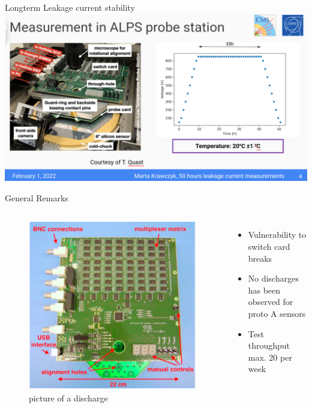 \documentclass{beamer}
\begin{document}
\begin{frame}{Longterm Leakage current stability}
  \includegraphics[width=.7\textwidth]{plots/Longterm_process.png}
\end{frame}


\begin{frame}{General Remarks}
  \begin{columns}
      \begin{figure}
        \includegraphics[width=.7\textwidth]{plots/Switch_Card.png}
        \caption{picture of a discharge}
      \end{figure}

    \begin{itemize}
      \small
      \item Vulnerability to switch card breaks
      \item No discharges has been observed for proto A sensors
      \item Test throughput max. 20 per week
    \end{itemize}
  \end{columns}
\end{frame}
\end{document}
